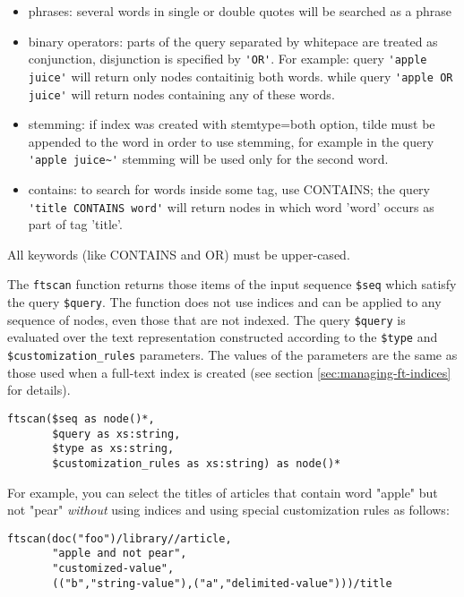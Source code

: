 \documentclass[a4paper,12pt]{article}
\begin{document}
\begin{itemize}
\item phrases: several words in single or double quotes will be searched as a
      phrase

\item binary operators: parts of the query separated by whitepace are treated
      as conjunction, disjunction is specified by \verb!'OR'!. For example:
      query \verb!'apple juice'! will return only nodes contaitinig both words.
      while query \verb!'apple OR juice'! will return nodes containing any of
      these words.

\item stemming: if index was created with stemtype=both option, tilde must be
      appended to the word in order to use stemming, for example in the query
      \verb!'apple juice~'! stemming will be used only for the second word.

\item contains: to search for words inside some tag, use CONTAINS; the query
      \verb!'title CONTAINS word'! will return nodes in which word 'word'
      occurs as part of tag 'title'.
\end{itemize}

All keywords (like CONTAINS and OR) must be upper-cased.

The \verb!ftscan! function returns those items of the input sequence \verb!$seq!
which satisfy the query \verb!$query!. The function does not use indices and can
be applied to any sequence of nodes, even those that are not indexed. The query
\verb!$query! is evaluated over the text representation constructed according to
the \verb!$type! and \verb!$customization_rules! parameters. The values of the
parameters are the same as those used when a full-text index is created (see
section \ref{sec:managing-ft-indices} for details).

\begin{verbatim}
ftscan($seq as node()*,
       $query as xs:string,
       $type as xs:string,
       $customization_rules as xs:string) as node()*
\end{verbatim}

For example, you can select the titles of articles that contain word "apple" but
not "pear" \emph{without} using indices and using special customization rules as
follows:

\begin{verbatim}
ftscan(doc("foo")/library//article,
       "apple and not pear",
       "customized-value",
       (("b","string-value"),("a","delimited-value")))/title
\end{verbatim}
\end{document}
